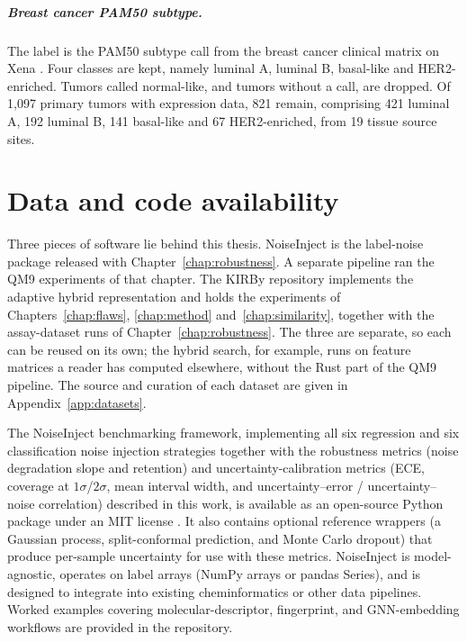 \paragraph{Breast cancer PAM50 subtype.} The label is the PAM50 subtype call \citep{Parker2009} from the breast cancer clinical matrix on Xena \citep{TCGA2012BRCA}. Four classes are kept, namely luminal A, luminal B, basal-like and HER2-enriched. Tumors called normal-like, and tumors without a call, are dropped. Of 1,097 primary tumors with expression data, 821 remain, comprising 421 luminal A, 192 luminal B, 141 basal-like and 67 HER2-enriched, from 19 tissue source sites.
\chapter{Data and code availability}\label{app:availability}

Three pieces of software lie behind this thesis. NoiseInject is the label-noise package released with Chapter~\ref{chap:robustness}. A separate pipeline ran the QM9 experiments of that chapter. The KIRBy repository implements the adaptive hybrid representation and holds the experiments of Chapters~\ref{chap:flaws}, \ref{chap:method} and~\ref{chap:similarity}, together with the assay-dataset runs of Chapter~\ref{chap:robustness}. The three are separate, so each can be reused on its own; the hybrid search, for example, runs on feature matrices a reader has computed elsewhere, without the Rust part of the QM9 pipeline. The source and curation of each dataset are given in Appendix~\ref{app:datasets}.

The NoiseInject benchmarking framework, implementing all six regression and six classification noise injection strategies together with the robustness metrics (noise degradation slope and retention) and uncertainty-calibration metrics (ECE, coverage at $1\sigma$/$2\sigma$, mean interval width, and uncertainty--error / uncertainty--noise correlation) described in this work, is available as an open-source Python package under an MIT license \citep{noiseinject}. It also contains optional reference wrappers (a Gaussian process, split-conformal prediction, and Monte Carlo dropout) that produce per-sample uncertainty for use with these metrics. NoiseInject is model-agnostic, operates on label arrays (NumPy arrays or pandas Series), and is designed to integrate into existing cheminformatics or other data pipelines. Worked examples covering molecular-descriptor, fingerprint, and GNN-embedding workflows are provided in the repository.

